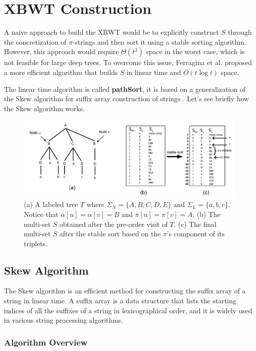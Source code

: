 \section{XBWT Construction}
A naive approach to build the XBWT would be to explicitly construct $S$ through the concretization of $\pi$-strings and then sort it using a stable sorting algorithm. However, this approach would require $\Theta(t^2)$ space in the worst case, which is not feasible for large deep trees. To overcome this issue, Ferragina et al. \cite{ferragina2009compressing} proposed a more efficient algorithm that builds $S$ in linear time and $O(t \log t)$ space.

The linear time algorithm is called \textbf{pathSort}, it is based on a generalization of the Skew algorithm for suffix array construction of strings \cite{karkkainen2006linear}. Let's see briefly how the Skew algorithm works.

\begin{figure}
    \centering
    \includegraphics[width=1\textwidth]{Immagini/XBWT_example.png}
    \caption[XBWT example]{(a) A labeled tree $T$ where $\Sigma_N = \{A, B, C, D, E\}$ and $\Sigma_L = \{a, b, c\}$. Notice that $\alpha[u] = \alpha[v] = B$ and $\pi[u] = \pi[v] = A$. (b) The multi-set $S$ obtained after the pre-order visit of $T$. (c) The final multi-set $S$ after the stable sort based on the $\pi$'s component of its triplets.}
    \label{fig:XBWT_example}
\end{figure}

\subsection{Skew Algorithm}
The Skew algorithm is an efficient method for constructing the suffix array of a string in linear time. A suffix array is a data structure that lists the starting indices of all the suffixes of a string in lexicographical order, and it is widely used in various string processing algorithms.

\subsubsection*{Algorithm Overview}

